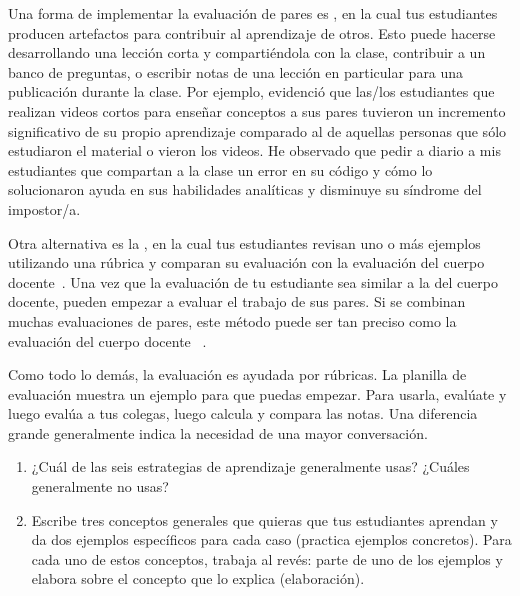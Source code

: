 Una forma de implementar la evaluación de pares es ,
en la cual tus estudiantes producen artefactos para contribuir al aprendizaje de otros.
Esto puede hacerse desarrollando una lección corta y compartiéndola con la clase,
contribuir a un banco de preguntas,
o escribir notas de una lección en particular para una publicación durante la clase.
Por ejemplo,
\cite{Fran2018} evidenció que las/los estudiantes que realizan videos cortos para enseñar conceptos a sus pares
tuvieron un incremento significativo de su propio aprendizaje
comparado al de aquellas personas que sólo estudiaron el material o vieron los videos.
He observado que pedir a diario a mis estudiantes que compartan a la clase un error en su código y cómo lo solucionaron ayuda en sus habilidades analíticas y disminuye su síndrome del impostor/a.

Otra alternativa es la ,
en la cual tus estudiantes revisan uno o más ejemplos utilizando una rúbrica
y comparan su evaluación con la evaluación del cuerpo docente~\cite{Kulk2013}.
Una vez que la evaluación de tu estudiante sea similar a la del cuerpo docente,
pueden empezar a evaluar el trabajo de sus pares.
Si se combinan muchas evaluaciones de pares,
este método puede ser tan preciso como la evaluación del cuerpo docente ~\cite{Pare2008}.

Como todo lo demás,
la evaluación es ayudada por rúbricas.
La planilla de evaluación  muestra un ejemplo para que puedas empezar.
Para usarla,
evalúate y luego evalúa a tus colegas,
luego calcula y compara las notas.
Una diferencia grande generalmente indica la necesidad de una mayor conversación.



\begin{enumerate}

\item
  ¿Cuál de las seis estrategias de aprendizaje generalmente usas?
  ¿Cuáles generalmente no usas?

\item
  Escribe tres conceptos generales que quieras que tus estudiantes aprendan
  y da dos ejemplos específicos para cada caso
  (practica ejemplos concretos).
  Para cada uno de estos conceptos,
  trabaja al revés: parte de uno de los ejemplos y elabora sobre el concepto que lo explica
  (elaboración).

\end{enumerate}


